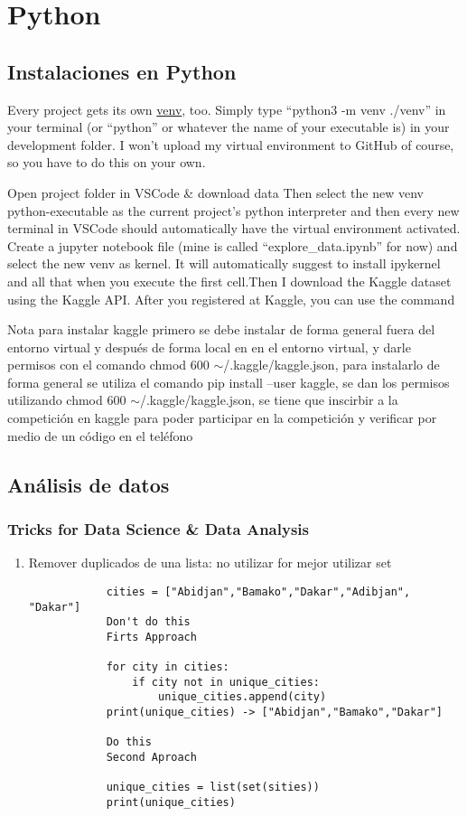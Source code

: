 \part{Python}

\chapter{Instalaciones en Python}

Every project gets its own \href{https://docs.python.org/3/library/venv.html}{\blue venv}, too. Simply type ``python3 -m venv ./venv'' in your
terminal (or ``python'' or whatever the name of your executable is) in your development
folder. I won't upload my virtual environment to GitHub of course, so you have to do this
on your own.

Open project folder in VSCode \& download data
Then select the new venv python-executable as the current project's python interpreter
and then every new terminal in VSCode should automatically have the virtual
environment activated. Create a jupyter notebook file (mine is called
``explore\_data.ipynb'' for now) and select the new venv as kernel. It will automatically
suggest to install ipykernel and all that when you execute the first cell.Then I download
the Kaggle dataset using the Kaggle API. After you registered at Kaggle, you can use
the command

Nota para instalar kaggle primero se debe instalar de forma general fuera del entorno virtual y despu\'es de forma local en en el 
entorno virtual, y darle permisos con el comando chmod 600 $\sim$/.kaggle/kaggle.json, para instalarlo de forma general se utiliza el comando pip install --user kaggle, se dan los permisos
utilizando chmod 600 $\sim$/.kaggle/kaggle.json, se tiene que inscirbir a la competici\'on en kaggle para poder participar en la competici\'on y verificar por medio de un c\'odigo en el tel\'efono



\chapter{An\'alisis de datos}

\section{Tricks for Data Science \& Data Analysis}
\begin{enumerate}
	\item Remover duplicados de una lista: no utilizar for mejor utilizar set
	     \begin{verbatim}
	     	cities = ["Abidjan","Bamako","Dakar","Adibjan", "Dakar"]
	     	Don't do this 
	     	Firts Approach
	     	
	     	for city in cities:
	     		if city not in unique_cities:
	     			unique_cities.append(city)
	     	print(unique_cities) -> ["Abidjan","Bamako","Dakar"]
	     	
	     	Do this
	     	Second Aproach
	     	
	     	unique_cities = list(set(sities))
	     	print(unique_cities)
	     \end{verbatim}
\end{enumerate}

